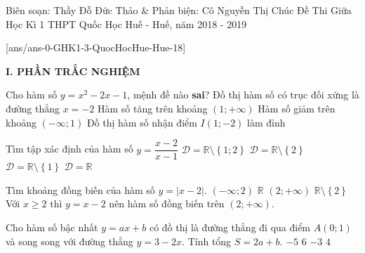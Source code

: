 \begin{name}
{Biên soạn: Thầy Đỗ Đức Thảo \& Phản biện: Cô Nguyễn Thị Chúc }
{Đề Thi Giữa Học Kì 1 THPT Quốc Học Huế - Huế, năm 2018 - 2019}
\end{name}

\setcounter{ex}{0}\setcounter{bt}{0}
[ans/ans-0-GHK1-3-QuocHocHue-Hue-18]

\noindent\textbf{I. PHẦN TRẮC NGHIỆM}
\begin{ex}%
	Cho hàm số $y=x^2-2x-1$, mệnh đề nào \textbf{sai}?
	\choice
	{\True Đồ thị hàm số có trục đối xứng là đường thẳng $x=-2$}
	{Hàm số tăng trên khoảng $(1;+\infty)$}
	{Hàm số giảm trên khoảng $(-\infty;1)$}
	{Đồ thị hàm số nhận điểm $I(1;-2)$ làm đỉnh}
\end{ex}
\begin{ex}%
	Tìm tập xác định của hàm số $y=\dfrac{x-2}{x-1}$
	\choice
	{$\mathscr{D}=\mathbb{R}\setminus \left\lbrace 1;2 \right\rbrace $}
	{ $\mathscr{D}=\mathbb{R}\setminus \left\lbrace 2 \right\rbrace $}
	{\True $\mathscr{D}=\mathbb{R}\setminus \left\lbrace 1 \right\rbrace $}
	{$\mathscr{D}=\mathbb{R}$}
\end{ex}
\begin{ex}%
	Tìm khoảng đồng biến của hàm số $y=\left| x-2 \right| $.
	\choice
	{$(-\infty;2)$}
	{$\mathbb{R}$}
	{\True $(2;+\infty)$}
	{$\mathbb{R}\setminus \left\lbrace 2 \right\rbrace$ }
	\loigiai
	{
		Với $x\ge 2$ thì $y=x-2$ nên hàm số đồng biến trên 	$(2;+\infty)$.
	}
	
\end{ex}
\begin{ex}%
	Cho hàm số bậc nhất $y=ax+b$ có đồ thị là đường thẳng đi qua điểm $A(0;1)$ và song song với đường thẳng $y=3-2x$. Tính tổng $S=2a+b$.
	\choice 
	{$-5$}
	{$6$}
	{\True $-3$}
	{$4$}
\end{ex}

